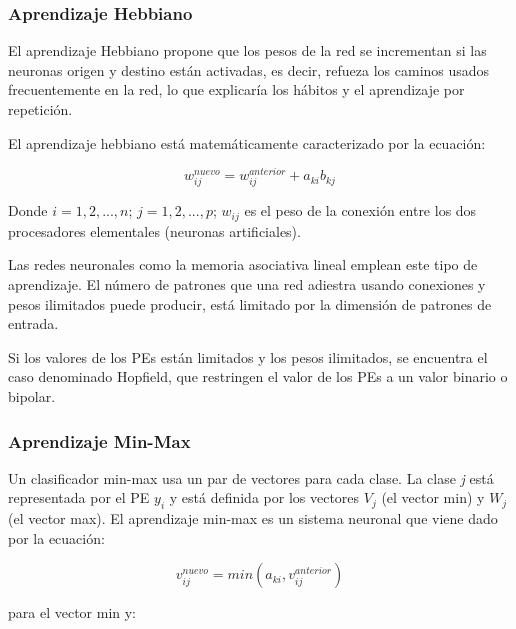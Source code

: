 \subsubsection{Aprendizaje Hebbiano}

El aprendizaje Hebbiano propone que los pesos de la red se incrementan si las
neuronas origen y destino están activadas, es decir, refueza los caminos usados
frecuentemente en la red, lo que explicaría los hábitos y el aprendizaje por
repetición.

El aprendizaje hebbiano está matemáticamente caracterizado por la ecuación:

$$ w_{ij}^{nuevo} = w_{ij}^{anterior} + a_{ki}b_{kj} $$

Donde $i = 1,2,...,n$; $j=1,2,...,p$; $w_{ij}$ es el peso de la conexión entre
los dos procesadores elementales (neuronas artificiales).

Las redes neuronales como la memoria asociativa lineal emplean este tipo de
aprendizaje. El número de patrones que una red adiestra usando conexiones y
pesos ilimitados puede producir, está limitado por la dimensión de patrones de
entrada.

Si los valores de los PEs están limitados y los pesos ilimitados, se encuentra
el caso denominado Hopfield, que restringen el valor de los PEs a un valor
binario o bipolar.  

%

\subsubsection{Aprendizaje Min-Max}

Un clasificador min-max usa un par de vectores para cada clase. La clase
\emph{j} está representada por el PE $y_i$ y está definida por los vectores
$V_j$ (el vector min) y $W_j$ (el vector max).  El aprendizaje min-max es un
sistema neuronal que viene dado por la ecuación:

$$ v_{ij}^{nuevo} = min(a_{ki},v_{ij}^{anterior}) $$

para el vector min y:

